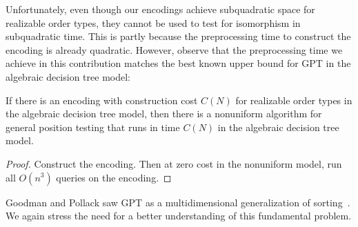 Unfortunately, even though our encodings achieve subquadratic space for
realizable order types, they cannot be used to test for isomorphism in
subquadratic time. This is partly because the preprocessing time to construct
the encoding is already quadratic.
%
However, observe that the preprocessing time we achieve in this contribution
matches the best known upper bound for GPT in the algebraic decision tree
model:
\begin{theorem}
  If there is an encoding with construction cost \(C(N)\) for
  realizable order types in the algebraic decision tree model, then
  there is a nonuniform algorithm for general position testing that runs
  in time \(C(N)\) in the algebraic decision tree model.
\end{theorem}
%
\begin{proof}
  Construct the encoding. Then at zero cost in the nonuniform
  model, run all \(O(n^3)\) queries on the encoding.
\end{proof}
%
Goodman and Pollack saw GPT as a multidimensional generalization of
sorting~\cite{GP83}.
%
We again stress the need for a better understanding of this fundamental
problem.
